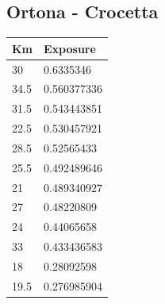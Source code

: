 \subsection{Ortona - Crocetta}
\begin{longtable}{|l|l|}
	\centering
	\rowcolor[HTML]{9B9B9B} \textbf{Km} & \textbf{Exposure} \\ \hline
	\rowcolor[HTML]{F8FF00} 
	30                                                      & 0.6335346                                                     \\
	\rowcolor[HTML]{F8FF00} 
	34.5                                                    & 0.560377336                                                   \\
	\rowcolor[HTML]{F8FF00} 
	31.5                                                    & 0.543443851                                                   \\
	\rowcolor[HTML]{F8FF00} 
	22.5                                                    & 0.530457921                                                   \\
	\rowcolor[HTML]{F8FF00} 
	28.5                                                    & 0.52565433                                                    \\
	\rowcolor[HTML]{F8FF00} 
	25.5                                                    & 0.492489646                                                   \\
	\rowcolor[HTML]{F8FF00} 
	21                                                      & 0.489340927                                                   \\
	\rowcolor[HTML]{F8FF00} 
	27                                                      & 0.48220809                                                    \\
	\rowcolor[HTML]{F8FF00} 
	24                                                      & 0.44065658                                                    \\
	\rowcolor[HTML]{F8FF00} 
	33                                                      & 0.433436583                                                   \\
	\rowcolor[HTML]{F8FF00} 
	18                                                      & 0.28092598                                                    \\
	\rowcolor[HTML]{F8FF00} 
	19.5                                                    & 0.276985904                                                   \\

\end{longtable}
